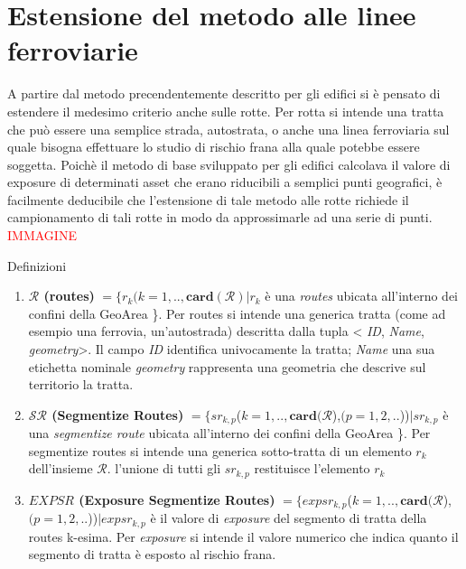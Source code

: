 
\chapter{Estensione del metodo alle linee ferroviarie} %
A partire dal metodo precendentemente descritto per gli edifici si è pensato di estendere il medesimo criterio anche sulle rotte. Per rotta si intende una tratta che può essere una semplice strada, autostrata, o anche una linea ferroviaria sul quale bisogna effettuare lo studio di rischio frana alla quale potebbe essere soggetta. Poichè il metodo di base sviluppato per gli edifici calcolava il valore di exposure di determinati asset che erano riducibili a semplici punti geografici, è facilmente deducibile che l'estensione di tale metodo alle rotte richiede il campionamento di tali rotte in modo da approssimarle ad una serie di punti.
\textcolor{red}{IMMAGINE}


Definizioni
\begin{enumerate}
	\item \textbf{$ \mathcal{R} $ (routes)} $ = \{r_k(k=1,..,\mathbf{card}(\mathcal{R}) | r_k $ è una \textit{routes} ubicata all'interno dei confini della  GeoArea \}. Per routes si intende una generica tratta (come ad esempio una ferrovia, un'autostrada) descritta dalla tupla < \textit{ID}, \textit{Name}, \textit{geometry}>. Il campo \textit{ID} identifica univocamente la tratta; \textit{Name} una sua etichetta nominale \textit{geometry} rappresenta una geometria che descrive sul territorio la tratta.
	
	
	\item \textbf{$ \mathcal{SR} $ (Segmentize Routes)} $ = \{sr_{k,p}$($k=1,..,\mathbf{card}(\mathcal{R}$),$(p = 1, 2, .. $))$  | sr_{k,p} $ è una \textit{segmentize route} ubicata all'interno dei confini della  GeoArea \}. Per segmentize routes si intende una generica sotto-tratta di un elemento $r_k$ dell'insieme $\mathcal{R}$. l'unione di tutti gli $sr_{k,p}$ restituisce l'elemento $r_k$ 
	
	\item \textbf{$EXPSR$ (Exposure Segmentize Routes)} $ = \{expsr_{k,p}$($k=1,..,\mathbf{card}(\mathcal{R}$),$(p = 1, 2, .. $))$ | expsr_{k,p} $ è il valore di \textit{exposure} del segmento di tratta della routes k-esima. Per \textit{exposure} si intende il valore numerico che indica quanto il segmento di tratta è esposto al rischio frana.
\end{enumerate}